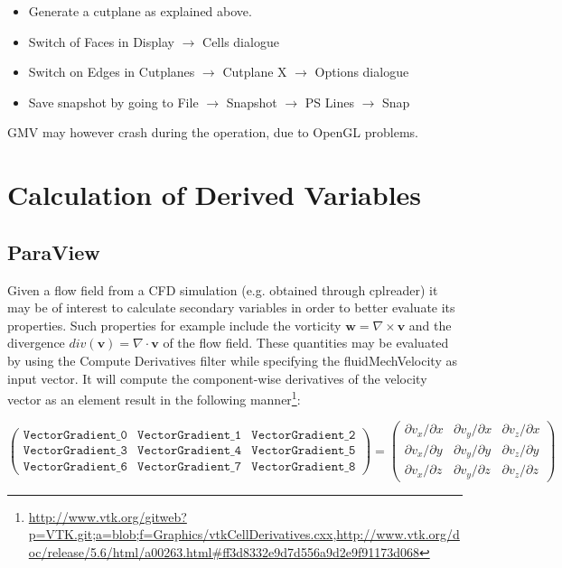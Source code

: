 \begin{itemize}
  \item Generate a cutplane as explained above.
  \item Switch of Faces in Display $\rightarrow$ Cells dialogue
  \item Switch  on Edges in  Cutplanes $\rightarrow$ Cutplane  X $\rightarrow$
Options dialogue
  \item Save snapshot by going to File $\rightarrow$ Snapshot $\rightarrow$ PS
Lines $\rightarrow$ Snap
\end{itemize}

GMV may however crash during the operation, due to OpenGL problems.

\section{Calculation of Derived Variables}

\subsection{ParaView}
Given a flow field from a  CFD simulation (e.g. obtained through cplreader) it
may  be  of interest  to  calculate secondary  variables  in  order to  better
evaluate its  properties.  Such properties  for example include  the vorticity
$\mathbf{w} = \nabla \times  \mathbf{v}$ and the divergence $div(\mathbf{v}) =
\nabla \cdot \mathbf{v}$ of the flow field.  These quantities may be evaluated
by using the Compute Derivatives filter while specifying the fluidMechVelocity
as  input vector.   It  will  compute the  component-wise  derivatives of  the
velocity    vector    as    an     element    result    in    the    following
manner\footnote{\url{http://www.vtk.org/gitweb?p=VTK.git;a=blob;f=Graphics/vtkCellDerivatives.cxx},\url{http://www.vtk.org/doc/release/5.6/html/a00263.html\#ff3d8332e9d7d556a9d2e9f91173d068}}:

\begin{displaymath}
  \begin{pmatrix} 
    \mathtt{VectorGradient\_0} & \mathtt{VectorGradient\_1} & \mathtt{VectorGradient\_2}\\
    \mathtt{VectorGradient\_3} & \mathtt{VectorGradient\_4} & \mathtt{VectorGradient\_5}\\
    \mathtt{VectorGradient\_6} & \mathtt{VectorGradient\_7} & \mathtt{VectorGradient\_8}
  \end{pmatrix} = 
  \begin{pmatrix} 
    \partial v_x / \partial x & \partial v_y / \partial x & \partial v_z / \partial x\\
    \partial v_x / \partial y & \partial v_y / \partial y & \partial v_z / \partial y\\
    \partial v_x / \partial z & \partial v_y / \partial z & \partial v_z / \partial z
  \end{pmatrix}
\end{displaymath}

